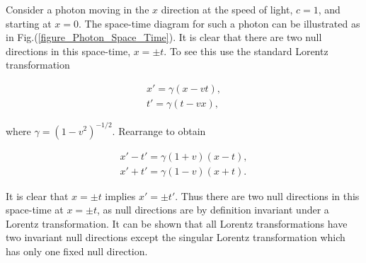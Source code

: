 Consider a photon moving in the $x$ direction at the speed of light, $c = 1$, and starting at $x = 0$. The space-time diagram for such a photon can be illustrated as in Fig.(\ref{figure_Photon_Space_Time}). It is clear that there are two null directions in this space-time, $x = \pm t$. To see this use the standard Lorentz transformation

\begin{align*}
x'  = \gamma (x - vt),  \\
t'  = \gamma (t - vx),
\end{align*}

\noindent where $\gamma = {(1 - v^2)}^{-1/2}$. Rearrange to obtain

\begin{eqnarray*}
x' - t' = \gamma (1 + v) (x - t), \\
x' + t' = \gamma (1 - v) (x + t).
\end{eqnarray*}

\noindent It is clear that $x = \pm t$ implies $x' = \pm t'$. Thus there are two null directions in this space-time at $x = \pm t$, as null directions are by definition invariant under a Lorentz transformation. It can be shown that all Lorentz transformations have two invariant null directions except the singular Lorentz transformation which has only one fixed null direction.  
